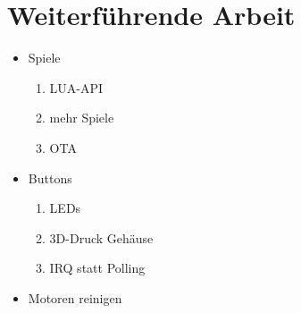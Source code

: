 \documentclass[a4paper]{article}
\begin{document}
\section{Weiterführende Arbeit}
\label{sec:further}
\begin{itemize}
    \item Spiele
	\begin{enumerate}
	    \item LUA-API
		\item mehr Spiele
		\item OTA
	\end{enumerate}
    \item Buttons	
	\begin{enumerate}
		\item LEDs
		\item 3D-Druck Gehäuse
		\item IRQ statt Polling
	\end{enumerate}
    \item Motoren reinigen
\end{itemize}
\end{document}
